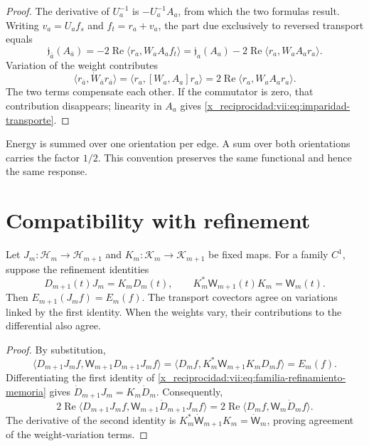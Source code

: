 \begin{proof}
The derivative of \(U_a^{-1}\) is \(-U_a^{-1}A_a\), from which
the two formulas result. Writing \(v_a=U_af_s\) and \(f_t=r_a+v_a\),
the part due exclusively to reversed transport equals
\[
 \mathfrak j_{\bar a}(A_{\bar a})
 =-2\operatorname{Re}\langle r_a,W_aA_af_t\rangle
 =\mathfrak j_a(A_a)
   -2\operatorname{Re}\langle r_a,W_aA_ar_a\rangle.
\]
Variation of the weight contributes
\[
 \langle r_{\bar a},\dot W_{\bar a}r_{\bar a}\rangle
 =\langle r_a,[W_a,A_a]r_a\rangle
 =2\operatorname{Re}\langle r_a,W_aA_ar_a\rangle.
\]
The two terms compensate each other. If the commutator is zero, that contribution
disappears; linearity in \(A_a\) gives
\eqref{x_reciprocidad:vii:eq:imparidad-transporte}.
\end{proof}

Energy is summed over one orientation per edge. A sum over both
orientations carries the factor \(1/2\). This convention preserves the same
functional and hence the same response.

\section{Compatibility with refinement}
\label{x_reciprocidad:vii:subsec:refinamiento-respuesta}

\begin{theorem}
\label{x_reciprocidad:vii:thm:refinamiento-respuesta}
Let \(J_m:\mathcal H_m\to\mathcal H_{m+1}\) and
\(K_m:\mathcal K_m\to\mathcal K_{m+1}\) be fixed maps.
For a family \(C^1\), suppose the refinement identities
\begin{equation}
 D_{m+1}(t)J_m=K_mD_m(t),\qquad
 K_m^*\mathsf W_{m+1}(t)K_m=\mathsf W_m(t).
 \label{x_reciprocidad:vii:eq:familia-refinamiento-memoria}
\end{equation}
Then \(E_{m+1}(J_mf)=E_m(f)\).
The transport covectors agree on variations linked by
the first identity. When the weights vary, their contributions
to the differential also agree.
\end{theorem}

\begin{proof}
By substitution,
\[
 \langle D_{m+1}J_mf,\mathsf W_{m+1}D_{m+1}J_mf\rangle
 =\langle D_mf,K_m^*\mathsf W_{m+1}K_mD_mf\rangle=E_m(f).
\]
Differentiating the first identity of
\eqref{x_reciprocidad:vii:eq:familia-refinamiento-memoria} gives
\(\dot D_{m+1}J_m=K_m\dot D_m\). Consequently,
\[
 2\operatorname{Re}
 \langle D_{m+1}J_mf,\mathsf W_{m+1}\dot D_{m+1}J_mf\rangle
 =2\operatorname{Re}\langle D_mf,\mathsf W_m\dot D_mf\rangle.
\]
The derivative of the second identity is
\(K_m^*\dot{\mathsf W}_{m+1}K_m=\dot{\mathsf W}_m\), proving
agreement of the weight-variation terms.
\end{proof}

